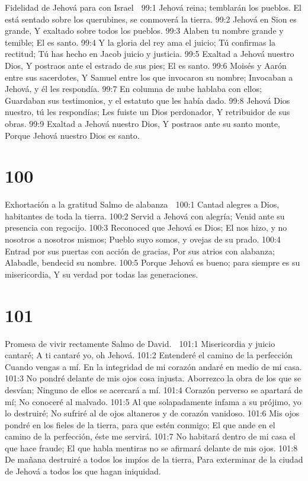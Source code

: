Fidelidad de Jehová para con Israel 

99:1 Jehová reina; temblarán los pueblos. 
El está sentado sobre los querubines, se conmoverá la tierra. 
99:2 Jehová en Sion es grande, 
Y exaltado sobre todos los pueblos. 
99:3 Alaben tu nombre grande y temible; 
El es santo. 
99:4 Y la gloria del rey ama el juicio; 
Tú confirmas la rectitud; 
Tú has hecho en Jacob juicio y justicia. 
99:5 Exaltad a Jehová nuestro Dios, 
Y postraos ante el estrado de sus pies; 
El es santo. 
99:6 Moisés y Aarón entre sus sacerdotes, 
Y Samuel entre los que invocaron su nombre; 
Invocaban a Jehová, y él les respondía. 
99:7 En columna de nube hablaba con ellos; 
Guardaban sus testimonios, y el estatuto que les había dado. 
99:8 Jehová Dios nuestro, tú les respondías; 
Les fuiste un Dios perdonador, 
Y retribuidor de sus obras. 
99:9 Exaltad a Jehová nuestro Dios, 
Y postraos ante su santo monte, 
Porque Jehová nuestro Dios es santo. 

\chapter{100}

Exhortación a la gratitud 
Salmo de alabanza 

100:1 Cantad alegres a Dios, habitantes de toda la tierra. 
100:2 Servid a Jehová con alegría; 
Venid ante su presencia con regocijo. 
100:3 Reconoced que Jehová es Dios; 
El nos hizo, y no nosotros a nosotros mismos; 
Pueblo suyo somos, y ovejas de su prado. 
100:4 Entrad por sus puertas con acción de gracias, 
Por sus atrios con alabanza; 
Alabadle, bendecid su nombre. 
100:5 Porque Jehová es bueno; para siempre es su misericordia, 
Y su verdad por todas las generaciones. 

\chapter{101}

Promesa de vivir rectamente 
Salmo de David. 

101:1 Misericordia y juicio cantaré; 
A ti cantaré yo, oh Jehová. 
101:2 Entenderé el camino de la perfección 
Cuando vengas a mí. 
En la integridad de mi corazón andaré en medio de mi casa. 
101:3 No pondré delante de mis ojos cosa injusta. 
Aborrezco la obra de los que se desvían; 
Ninguno de ellos se acercará a mí. 
101:4 Corazón perverso se apartará de mí; 
No conoceré al malvado. 
101:5 Al que solapadamente infama a su prójimo, yo lo destruiré; 
No sufriré al de ojos altaneros y de corazón vanidoso. 
101:6 Mis ojos pondré en los fieles de la tierra, para que estén conmigo; 
El que ande en el camino de la perfección, éste me servirá. 
101:7 No habitará dentro de mi casa el que hace fraude; 
El que habla mentiras no se afirmará delante de mis ojos. 
101:8 De mañana destruiré a todos los impíos de la tierra, 
Para exterminar de la ciudad de Jehová a todos los que hagan iniquidad. 

